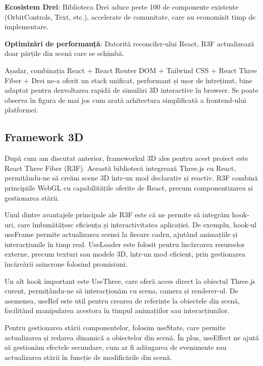 \textbf{Ecosistem Drei}:
  Biblioteca Drei aduce peste 100 de componente existente (OrbitControls,
  Text, etc.), accelerate de comunitate, care au economisit timp de
  implementare.

\textbf{Optimizări de performanță}:
  Datorită reconciler-ului React, R3F actualizează doar părțile
  din scenă care se schimbă.

Așadar, combinația React + React Router DOM + Tailwind CSS + React Three Fiber + Drei ne-a oferit un
stack unificat, performant și ușor de întreținut, bine adaptat
pentru dezvoltarea rapidă de simulări 3D interactive în browser. Se poate observa în figura de mai jos cum arată
arhitectura simplificată a frontend-ului platformei.


\subsection{Framework 3D}

După cum am discutat anterior, frameworkul 3D ales pentru acest proiect este React Three Fiber (R3F).
Această bibliotecă integrează Three.js cu React, permițându-ne să creăm scene 3D într-un mod declarativ 
și reactiv. R3F combină principiile WebGL cu capabilitățile oferite de React, precum componentizarea și
gestionarea stării.

Unul dintre avantajele principale ale R3F este că ne permite să integrăm hook-uri, care îmbunătățesc
eficiența și interactivitatea aplicației. De exemplu, hook-ul useFrame permite actualizarea 
scenei la fiecare cadru, ajutând animațiile și interacțiunile în timp real. UseLoader este
folosit pentru încărcarea resurselor externe, precum texturi sau modele 3D, într-un mod eficient,
prin gestionarea încărcării asincrone folosind promisiuni.

Un alt hook important este UseThree, care oferă acces direct la obiectul Three.js curent, 
permițându-ne să interacționăm cu scena, camera și renderer-ul. De asemenea, useRef este
util pentru crearea de referințe la obiectele din scenă, facilitând manipularea acestora în timpul 
animațiilor sau interacțiunilor.

Pentru gestionarea stării componentelor, folosim useState, care permite actualizarea și 
redarea dinamică a obiectelor din scenă. În plus, useEffect ne ajută să gestionăm efectele 
secundare, cum ar fi adăugarea de evenimente sau actualizarea stării în funcție de modificările din scenă.

